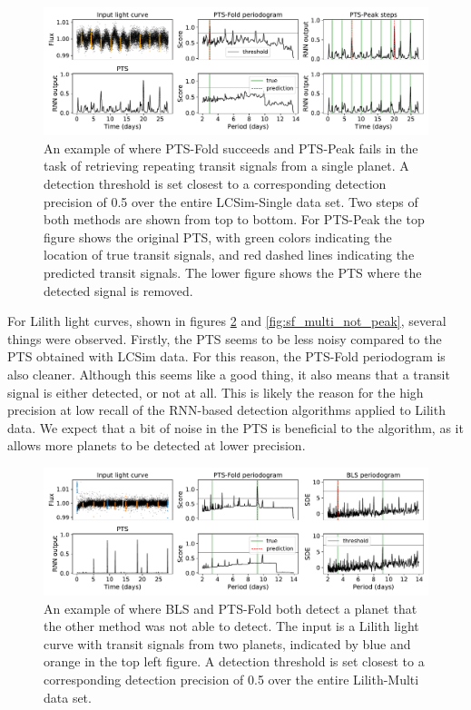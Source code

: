 \begin{figure}
    \centering
    \includegraphics[width=\linewidth]{Experiments/Figures/Cases/sf_single_fold_not_peak_1.pdf}
    \caption{An example of where PTS-Fold succeeds and PTS-Peak fails in the task of retrieving repeating transit signals from a single planet. A detection threshold is set closest to a corresponding detection precision of 0.5 over the entire LCSim-Single data set. Two steps of both methods are shown from top to bottom. For PTS-Peak the top figure shows the original PTS, with green colors indicating the location of true transit signals, and red dashed lines indicating the predicted transit signals. The lower figure shows the PTS where the detected signal is removed.}
    \label{fig:sf_single_fold_not_peak}
\end{figure}
For Lilith light curves, shown in figures \ref{fig:sf_multi_viceversa} and \ref{fig:sf_multi_not_peak}, several things were observed. Firstly, the PTS seems to be less noisy compared to the PTS obtained with LCSim data. For this reason, the PTS-Fold periodogram is also cleaner.  Although this seems like a good thing, it also means that a transit signal is either detected, or not at all. This is likely the reason for the high precision at low recall of the RNN-based detection algorithms applied to Lilith data. We expect that a bit of noise in the PTS is beneficial to the algorithm, as it allows more planets to be detected at lower precision. 

\begin{figure}
    \centering
    \includegraphics[width=\linewidth]{Experiments/Figures/Cases/sf_multi_vice.pdf}
    \caption{An example of where BLS and PTS-Fold both detect a planet that the other method was not able to detect. The input is a Lilith light curve with transit signals from two planets, indicated by blue and orange in the top left figure. A detection threshold is set closest to a corresponding detection precision of 0.5 over the entire Lilith-Multi data set.}
    \label{fig:sf_multi_viceversa}
\end{figure}

